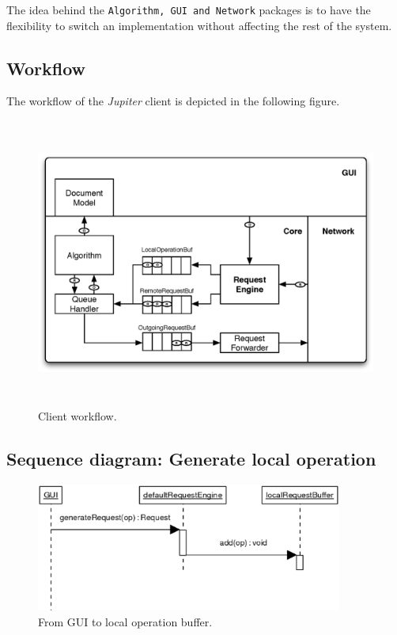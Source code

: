 The idea behind the \texttt{Algorithm, GUI and Network} packages is to have the flexibility to switch an implementation without affecting the rest of the system.

\subsection{Workflow}
The workflow of the \emph{Jupiter} client is depicted in the following figure.
\begin{figure}[H]
\centering
\includegraphics[height=9.5cm,width=14.3cm]{../../images/algo-impl/workflow_client.eps}
\caption{Client workflow.}
\label{Client workflow.}
\end{figure}

\subsection{Sequence diagram: Generate local operation}
\begin{figure}[H]
\centering
\includegraphics[height=4.23cm,width=10.09cm]{../../images/algo-impl/client_generate_request.eps}
\caption{From GUI to local operation buffer.}
\label{From GUI to local operation buffer.}
\end{figure}

